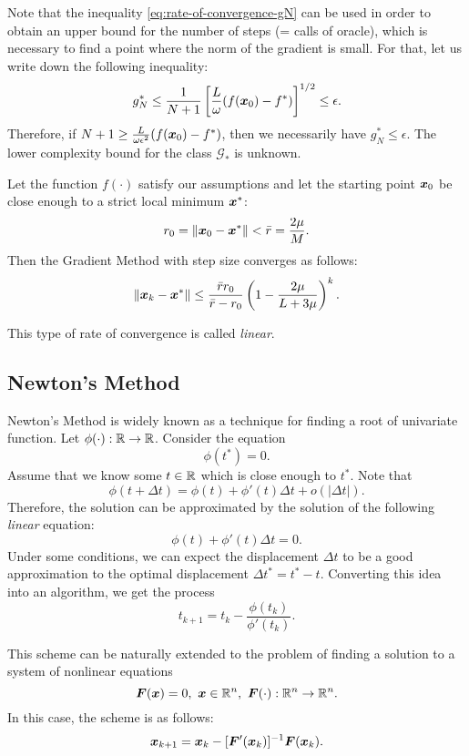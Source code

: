 Note that the inequality \ref{eq:rate-of-convergence-gN} can be used in order to obtain an upper bound for the number of steps (= calls of oracle), which is necessary to
find a point where the norm of the gradient is small. For that, let us write down the following inequality:
\begin{equation}\label{eq:upper-bound-grad}
    g_N^* \le \frac{1}{N+1}\left[\frac{L}{\omega} (f(\bm{x}_0) - f^*)\right]^{1/2} \le \epsilon.
\end{equation}
Therefore, if \(N + 1 \ge \frac{L}{\omega \epsilon^2} (f(\bm{x}_0) - f^*)\), then we necessarily have \(g_N^* \le \epsilon\).
The lower complexity bound for the class \(\mathscr{G}_*\) is unknown.

\begin{thm}
    Let the function \(f(\cdot)\) satisfy our assumptions and let the starting point \(\bm{x}_0\) be close enough to a strict local minimum \(\bm{x}^*\):
    \[
        r_0 = \norm{\bm{x}_0 - \bm{x}^*} < \bar{r} = \frac{2\mu}{M}.  
    \]
    Then the Gradient Method with step size converges as follows:
    \[
        \norm{\bm{x}_k - \bm{x}^*} \le \frac{\bar{r}r_0}{\bar{r} - r_0} \left(1 - \frac{2\mu}{L+3\mu}\right)^k. 
    \]
\end{thm}
This type of rate of convergence is called \emph{linear}.

\subsection{Newton's Method}\label{subsect:newton-method}
Newton's Method is widely known as a technique for finding a root of univariate function. Let \(\phi(\cdot): \mathbb{R} \to \mathbb{R}\). Consider the equation
\[
    \phi(t^*) = 0.  
\]
Assume that we know some \(t \in \mathbb{R}\) which is close enough to \(t^*\). Note that
\[
    \phi(t + \Delta t) = \phi(t) + \phi'(t) \Delta t + o(|\Delta t|).  
\]
Therefore, the solution can be approximated by the solution of the following \emph{linear} equation:
\[
    \phi(t) + \phi'(t) \Delta t = 0.  
\]
Under some conditions, we can expect the displacement \(\Delta t\) to be a good approximation to the optimal displacement \(\Delta t^* = t^* - t\).
Converting this idea into an algorithm, we get the process
\[
    t_{k+1} = t_k - \frac{\phi(t_k)}{\phi'(t_k)}.  
\]

This scheme can be naturally extended to the problem of finding a solution to a system of nonlinear equations
\[
    \bm{F}(\bm{x}) = 0, ~\bm{x} \in \mathbb{R}^n, ~\bm{F}(\cdot):\mathbb{R}^n \to \mathbb{R}^n.
\]
In this case, the scheme is as follows:
\[
    \bm{x}_{k+1} = \bm{x}_k - [\bm{F}'(\bm{x}_k)]^{-1}\bm{F}(\bm{x}_k).  
\]

